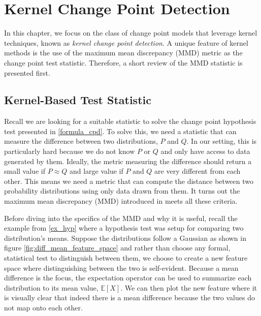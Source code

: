 \chapter{Kernel Change Point Detection}
\label{chapter3}
In this chapter, we focus on the class of change point models that leverage kernel techniques, known as \textit{kernel change point detection}. A unique feature of kernel methods is the use of the maximum mean discrepancy (MMD) metric as the change point test statistic. Therefore, a short review of the MMD statistic is presented first.



\section{Kernel-Based Test Statistic}
\label{mmd}
Recall we are looking for a suitable statistic to solve the change point hypothesis test presented in \ref{formula_cpd}. To solve this, we need a statistic that can measure the difference between two distributions, $P$ and $Q$. In our setting, this is particularly hard because we do not know $P$ or $Q$ and only have access to data generated by them. Ideally, the metric measuring the difference should return a small value if $P \approx  Q$ and large value if $P$ and $Q$ are very different from each other. This means we need a metric that can compute the distance between two probability distributions using only data drawn from them. It turns out the maximum mean discrepancy (MMD) introduced in \cite{gretton2012kernel} meets all these criteria.

Before diving into the specifics of the MMD and why it is useful, recall the example from \ref{ex_hyp} where a hypothesis test was setup for comparing two distribution's means. Suppose the distributions follow a Gaussian as shown in figure \ref{fig:diff_mean_feature_space} and rather than choose any formal, statistical test to distinguish between them, we choose to create a new feature space where distinguishing between the two is self-evident. Because a mean difference is the focus, the expectation operator can be used to summarize each distribution to its mean value, $\mathbb{E}[X]$. We can then plot the new feature where it is visually clear that indeed there is a mean difference because the two values do not map onto each other. 

